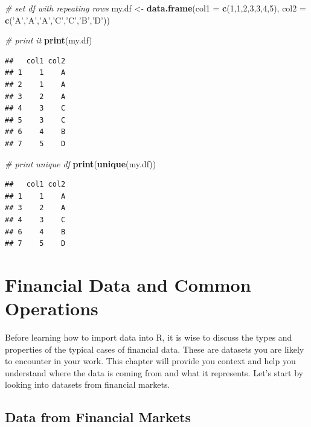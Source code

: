 \documentclass[11pt,]{book}
\newenvironment{Shaded}{\begin{snugshade}}{\end{snugshade}}
\newcommand{\KeywordTok}[1]{\textcolor[rgb]{0.27,0.27,0.27}{\textbf{#1}}}
\newcommand{\DataTypeTok}[1]{\textcolor[rgb]{0.27,0.27,0.27}{#1}}
\newcommand{\DecValTok}[1]{\textcolor[rgb]{0.06,0.06,0.06}{#1}}
\newcommand{\StringTok}[1]{\textcolor[rgb]{0.5,0.5,0.5}{#1}}
\newcommand{\CommentTok}[1]{\textcolor[rgb]{0.56,0.35,0.01}{\textit{#1}}}
\newcommand{\NormalTok}[1]{#1}
\begin{document}
\begin{Shaded}
\begin{Highlighting}[]
\CommentTok{# set df with repeating rows}
\NormalTok{my.df <-}\StringTok{ }\KeywordTok{data.frame}\NormalTok{(}\DataTypeTok{col1 =} \KeywordTok{c}\NormalTok{(}\DecValTok{1}\NormalTok{,}\DecValTok{1}\NormalTok{,}\DecValTok{2}\NormalTok{,}\DecValTok{3}\NormalTok{,}\DecValTok{3}\NormalTok{,}\DecValTok{4}\NormalTok{,}\DecValTok{5}\NormalTok{), }
                    \DataTypeTok{col2 =} \KeywordTok{c}\NormalTok{(}\StringTok{'A'}\NormalTok{,}\StringTok{'A'}\NormalTok{,}\StringTok{'A'}\NormalTok{,}\StringTok{'C'}\NormalTok{,}\StringTok{'C'}\NormalTok{,}\StringTok{'B'}\NormalTok{,}\StringTok{'D'}\NormalTok{))}

\CommentTok{# print it                  }
\KeywordTok{print}\NormalTok{(my.df)}
\end{Highlighting}
\end{Shaded}

\begin{verbatim}
##   col1 col2
## 1    1    A
## 2    1    A
## 3    2    A
## 4    3    C
## 5    3    C
## 6    4    B
## 7    5    D
\end{verbatim}

\begin{Shaded}
\begin{Highlighting}[]
\CommentTok{# print unique df}
\KeywordTok{print}\NormalTok{(}\KeywordTok{unique}\NormalTok{(my.df))}
\end{Highlighting}
\end{Shaded}

\begin{verbatim}
##   col1 col2
## 1    1    A
## 3    2    A
## 4    3    C
## 6    4    B
## 7    5    D
\end{verbatim}

\chapter{Financial Data and Common Operations}\label{Financial-data}

Before learning how to import data into R, it is wise to discuss the
types and properties of the typical cases of financial data. These are
datasets you are likely to encounter in your work. This chapter will
provide you context and help you understand where the data is coming
from and what it represents. Let's start by looking into datasets from
financial markets.

\section{Data from Financial Markets}\label{data-from-financial-markets}
\end{document}
